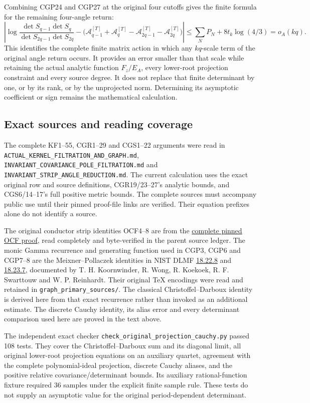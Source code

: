 Combining CGP24 and CGP27 at the original four cutoffs gives the finite formula for the remaining four-angle return: \[
\boxed{\left|
\log\frac{\det S_{q-1}\det S_q}{\det S_{2q-1}\det S_{2q}}
-\bigl(\mathcal A_{q-1}^{[T]}+\mathcal A_q^{[T]}
-\mathcal A_{2q-1}^{[T]}-\mathcal A_{2q}^{[T]}\bigr)
\right|
\le\sum_NP_N+8t_k\log(4/3)=o_A(kq).}
\tag{CGP28}
\] This identifies the complete finite matrix action in which any \(kq\)-scale term of the original angle return occurs. It provides an error smaller than that scale while retaining the actual analytic function \(F_z/E_A\), every lower-root projection constraint and every source degree. It does not replace that finite determinant by one, or by its rank, or by the unprojected norm. Determining its asymptotic coefficient or sign remains the mathematical calculation.

\subsection{Exact sources and reading coverage}\label{exact-sources-and-reading-coverage}

The complete KF1--55, CGR1--29 and CGS1--22 arguments were read in \nolinkurl{ACTUAL_KERNEL_FILTRATION_AND_GRAPH.md}, \nolinkurl{INVARIANT_COVARIANCE_POLE_FILTRATION.md} and \nolinkurl{INVARIANT_STRIP_ANGLE_REDUCTION.md}. The current calculation uses the exact original row and source definitions, CGR19/23--27's analytic bounds, and CGS6/14--17's full positive metric bounds. The complete sources must accompany public use until their pinned proof-file links are verified. Their equation prefixes alone do not identify a source.

The original conductor strip identities OCF4--8 are from the \href{https://github.com/KokunoYumeto/zeta-function-research-reader/blob/5992ad50c0f2a06921f1fcaded7b4e38097c0739/workbenches/splitzero-tandem/continuations/20260920-original-kernel-mixed-determinants/providers/ORIGINAL_CONDUCTOR_STRIP_FRAME.tex\#L27}{complete pinned OCF proof}, read completely and byte-verified in the parent source ledger. The monic Gamma recurrence and generating function used in CGP3, CGP6 and CGP7--8 are the Meixner--Pollaczek identities in NIST DLMF \href{https://dlmf.nist.gov/18.22.E8}{18.22.8} and \href{https://dlmf.nist.gov/18.23.E7}{18.23.7}, documented by T. H. Koornwinder, R. Wong, R. Koekoek, R. F. Swarttouw and W. P. Reinhardt. Their original TeX encodings were read and retained in \nolinkurl{graph_primary_sources/}. The classical Christoffel--Darboux identity is derived here from that exact recurrence rather than invoked as an additional estimate. The discrete Cauchy identity, its alias error and every determinant comparison used here are proved in the text above.

The independent exact checker \nolinkurl{check_original_projection_cauchy.py} passed 108 tests. They cover the Christoffel--Darboux sum and its diagonal limit, all original lower-root projection equations on an auxiliary quartet, agreement with the complete polynomial-ideal projection, discrete Cauchy aliases, and the positive relative covariance/determinant bounds. Its auxiliary rational-function fixture required 36 samples under the explicit finite sample rule. These tests do not supply an asymptotic value for the original period-dependent determinant.

